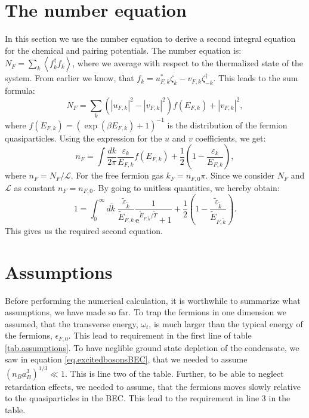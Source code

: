 \section{The number equation} \label{sec.chemicalpotential.numberequation}
In this section we use the number equation to derive a second integral equation for the chemical and pairing potentials. The number equation is: $N_F = \sum_k \left \langle f_k^\dagger f_k \right \rangle$, where we average with respect to the thermalized state of the system. From earlier we know, that $f_k = u_{F,k}^* \zeta_k -v_{F,k} \zeta_{-k}^\dagger$. This leads to the sum formula:
\begin{equation}
N_F = \sum_k \left(|u_{F,k}|^2-|v_{F,k}|^2\right) f(E_{F,k}) + |v_{F,k}|^2,\nonumber
\end{equation}
where $f(E_{F,k}) = (\exp(\beta E_{F,k}) + 1)^{-1}$ is the distribution of the fermion quasiparticles. Using the expression for the $u$ and $v$ coefficients, we get:
\begin{equation}
n_F = \int \frac{dk}{2\pi} \frac{\varepsilon_k}{E_{F,k}}f(E_{F,k}) + \frac{1}{2}\left(1 - \frac{\varepsilon_k}{E_{F,k}}\right), \nonumber
\end{equation}
where $n_F = N_F/\mathcal{L}$. For the free fermion gas $k_F = n_{F,0}\pi$. Since we consider $N_F$ and $\mathcal{L}$ as constant $n_F = n_{F,0}$. By going to unitless quantities, we hereby obtain:
\begin{equation}
1 = \int_0^\infty d\tilde{k} \; \frac{\tilde{\varepsilon}_{\tilde{k}}}{\tilde{E}_{F,k}}\frac{1}{\text{e}^{ \tilde{E}_{F,\tilde{k}}/\tilde{T} } + 1 } + \frac{1}{2}\left(1 - \frac{\tilde{\varepsilon}_{\tilde{k}}}{\tilde{E}_{F,\tilde{k}}}\right). 
\label{eq.NumberEquationUnitless}
\end{equation}
This gives us the required second equation.

\section{Assumptions}
Before performing the numerical calculation, it is worthwhile to summarize what assumptions, we have made so far. To trap the fermions in one dimension we assumed, that the transverse energy, $\omega_t$, is much larger than the typical energy of the fermions, $\epsilon_{F,0}$. This lead to requirement in the first line of table \ref{tab.assumptions}. To have neglible ground state depletion of the condensate, we saw in equation \eqref{eq.excitedbosonsBEC}, that we needed to assume $(n_Ba_B^3)^{1/3}\ll 1$. This is line two of the table. Further, to be able to neglect retardation effects, we needed to assume, that the fermions moves slowly relative to the quasiparticles in the BEC. This lead to the requirement in line 3 in the table.

